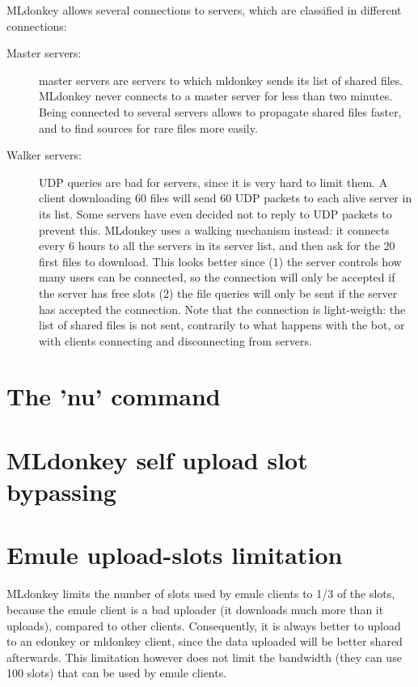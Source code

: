 \documentclass{article}
\begin{document}
MLdonkey allows several connections to servers, which are classified in different connections:
\begin{description}

 \item[Master servers:] master servers are servers to which mldonkey sends
its list of shared files. MLdonkey never connects to a master server for less
than two minutes. Being connected to several servers allows to propagate
shared files faster, and to find sources for rare files more easily.

 \item[Walker servers:] UDP queries are bad for servers, since it is very
hard to limit them. A client downloading 60 files will send 60 UDP packets to
each alive server in its list. Some servers have even decided not to reply to
UDP packets to prevent this. MLdonkey uses a walking mechanism instead: it
connects every 6 hours to all the servers in its server list, and then ask
for the 20 first files to download. This looks better since (1) the server
controls how many users can be connected, so the connection will only be
accepted if the server has free slots (2) the file queries will only be sent
if the server has accepted the connection. Note that the connection is
light-weigth: the list of shared files is not sent, contrarily to what
happens with the bot, or with clients connecting and disconnecting from
servers.

\end{description}

\section{The 'nu' command}

\section{MLdonkey self upload slot bypassing}

\section{Emule upload-slots limitation}

 MLdonkey limits the number of slots used by emule clients to 1/3 of the
slots, because the emule client is a bad uploader (it downloads much more
than it uploads), compared to other clients. Consequently, it is always
better to upload to an edonkey or mldonkey client, since the data uploaded
will be better shared afterwards. This limitation however does not limit the
bandwidth (they can use 100%
slots) that can be used by emule clients.
\end{document}
